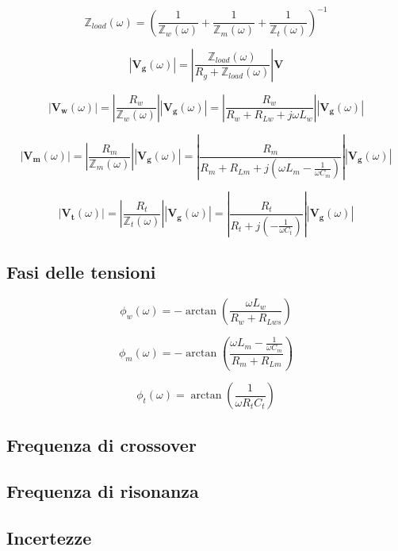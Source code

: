 \documentclass[12pt,italian]{article}
\begin{document}
\begin{equation*}
	\mathbb{Z}_{load}(\omega) = \left(\frac{1}{\mathbb{Z}_{w}(\omega)} + \frac{1}{\mathbb{Z}_{m}(\omega)} + \frac{1}{\mathbb{Z}_{t}(\omega)}\right)^{-1}
\end{equation*}

\begin{equation}
	\left| \mathbf{V_{g}}(\omega) \right| = \left| \frac{\mathbb{Z}_{load}(\omega)}
	{R_{g}+\mathbb{Z}_{load}(\omega)}\right| \mathbf{V}
\end{equation}

\begin{equation}
	\left| \mathbf{V_{w}}(\omega) \right| = \left| \frac{R_{w}}
	{\mathbb{Z}_{w}(\omega)}\right|\left| \mathbf{V_{g}}(\omega) \right| = \left| \frac{R_{w}}
	{R_{w}+R_{Lw} + j \omega L_w}\right|\left| \mathbf{V_{g}}(\omega) \right|
\end{equation}

\begin{equation}
	\left| \mathbf{V_{m}}(\omega) \right| = \left| \frac{R_{m}}
	{\mathbb{Z}_{m}(\omega)}\right|\left| \mathbf{V_{g}}(\omega) \right| = \left| \frac{R_{m}}{R_{m}+R_{Lm} + j (\omega L_m - \frac{1}{\omega C_{m}})} \right| \left| \mathbf{V_{g}}(\omega) \right|
\end{equation}

\begin{equation}
	\left| \mathbf{V_{t}}(\omega) \right| = \left| \frac{R_{t}}
	{\mathbb{Z}_{t}(\omega)}\right|\left| \mathbf{V_{g}}(\omega) \right| = \left| \frac{R_{t}}{R_{t} + j (-\frac{1}{\omega C_{t}})}\right|\left| \mathbf{V_{g}}(\omega) \right|
\end{equation}

\subsection{Fasi delle tensioni}
\label{sec:fasi}

\begin{equation}
	\phi_{w}(\omega) = - \arctan\left(\frac{\omega L_{w}}{R_{w}+R_{Lws}}\right)
\end{equation}

\begin{equation}
	\phi_{m}(\omega) = - \arctan\left(\frac{\omega L_{m} - \frac{1}{\omega C_{m}}}{R_{m}+R_{Lm}}\right)
\end{equation}

\begin{equation}
	\phi_{t}(\omega) = \arctan\left(\frac{1}{\omega R_{t} C_{t}}\right)
\end{equation}

\subsection{Frequenza di crossover}
\label{sec:crossFreq}

\subsection{Frequenza di risonanza}
\label{sec:resFreq}

\subsection{Incertezze}
\end{document}
